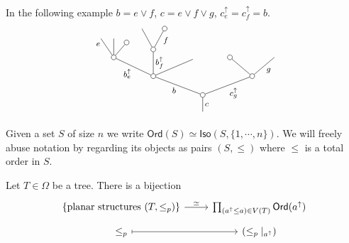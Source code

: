 \documentclass[a4paper,10pt]{article}%
\begin{document}
\begin{example} In the following example $b = e \vee f$, $c = e \vee f \vee g$, $c^{\uparrow}_e= c^{\uparrow}_f =b$.
\[
	\begin{tikzpicture}[grow=up,auto,level distance=1.9em,
	every node/.style = {font=\footnotesize,inner sep=2pt},
	dummy/.style={circle,draw,inner sep=0pt,minimum size=1.75mm}]
		\node at (0,0) {}
			child{node [dummy] {}
				child[sibling distance = 10em]{node [dummy] {}
					child[sibling distance = 4.5em]{
					edge from parent node [swap] {$g$}}
					child[sibling distance = 4.5em]{node [dummy] {}}
				edge from parent node [swap] {$c_g^{\uparrow}$}}
				child[sibling distance = 10em]{node [dummy] {}
					child[sibling distance = 4em,level distance=1.7em]
					child[sibling distance = 1.5em,level distance=2.7em]{node [dummy] {}
						child[level distance=2.1em,sibling distance = 2.3em]{node [dummy] {}
						edge from parent node [near end,swap] {$f$}}		
						child[level distance=2.1em,sibling distance = 2.3em]{
						edge from parent node [near end] {}}
					edge from parent node [swap] {$b^{\uparrow}_{f}$}}
					child[sibling distance = 4em]{node [dummy] {}
						child[sibling distance =1.3em, level distance = 1.5 em]{node [dummy]  {}
						edge from parent node [swap] {}}
						child[sibling distance = 1.3em]{
						edge from parent node [very near end,swap] {}}
						child[sibling distance =1.3em]{
						edge from parent node [very near end] {$e$}}
					edge from parent node {$b^{\uparrow}_e$}}
				edge from parent node {$b$}}
			edge from parent node [swap] {$c$}};
	\end{tikzpicture}
\]
\end{example}


\begin{notation}
	Given a set $S$ of size $n$ we write
	$\textsf{Ord}(S) \simeq \mathsf{Iso}(S,\{1,\cdots,n\})$. We will freely abuse notation by regarding its objects as pairs $(S,\leq)$ where $\leq$ is a total order in $S$.
\end{notation}


\begin{proposition}\label{PLANARIZATIONCHAR PROP}
	Let $T \in \Omega$ be a tree. There is a bijection
	\begin{equation}\label{PLANAR EQ}
	\begin{tikzcd}[row sep = 0.5em]
		\{\text{planar structures }(T,\leq_p)\} \ar{r}{\simeq} &
		\prod_{(a^{\uparrow} \leq a) \in V(T)} \mathsf{Ord}(a^{\uparrow}) \\
		\leq_p \ar[mapsto]{r} & (\leq_p|_{a^{\uparrow}})
	\end{tikzcd}	
	\end{equation}
\end{proposition}
\end{document}

